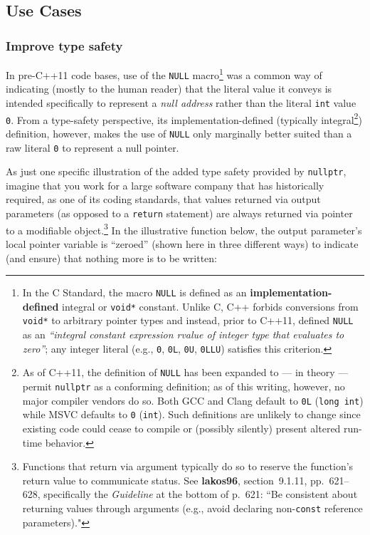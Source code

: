 \subsection[Use Cases]{Use Cases}\label{use-cases}

\subsubsection[Improve type safety]{Improve type safety}\label{improve-type-safety}

In pre-C++11 code bases, use of the \texttt{NULL}
macro{\cprotect\footnote{In the C Standard, the macro \texttt{NULL} is
defined as an \textbf{implementation-defined} integral or \texttt{void*}
constant. Unlike C, C++ forbids conversions from \texttt{void*} to
arbitrary pointer types and instead, prior to C++11, defined
\texttt{NULL} as an \emph{``integral constant expression rvalue of
integer type that evaluates to zero''}; any integer literal (e.g.,
\texttt{0}, \texttt{0L}, \texttt{0U}, \texttt{0LLU}) satisfies this
criterion.}} was a common way of indicating (mostly to the human
reader) that the literal value it conveys is intended specifically to
represent a \emph{null address} rather than the literal \texttt{int}
value \texttt{0}. From a type-safety perspective, its
implementation-defined (typically integral{\cprotect\footnote{As of
C++11, the definition of \texttt{NULL} has been expanded to --- in
theory --- permit \texttt{nullptr} as a conforming definition; as of
this writing, however, no major compiler vendors do so. Both GCC and
Clang default to \texttt{0L} (\texttt{long}~\texttt{int}) while MSVC
defaults to \texttt{0} (\texttt{int}). Such definitions are unlikely
to change since existing code could cease to compile or (possibly
silently) present altered run-time behavior.}}) definition, however,
makes the use of \texttt{NULL} only marginally better suited than a raw
literal \texttt{0} to represent a null pointer.

As just one specific illustration of the added type safety provided by
\texttt{nullptr}, imagine that you work for a large software company
that has historically required, as one of its coding standards, that
values returned via output parameters (as opposed to a \texttt{return}
statement) are always returned via pointer to a modifiable
object.{\cprotect\footnote{Functions that return via argument typically
do so to reserve the function's return value to communicate status.
See \textbf{{lakos96}}, section~9.1.11, pp.~621--628, specifically the
\emph{Guideline} at the bottom of p.~621: ``Be consistent about
returning values through arguments (e.g., avoid declaring
non-\texttt{const} reference parameters)."}} In the illustrative function below, the output parameter's local pointer
variable is ``zeroed'' (shown here in three different ways) to indicate
(and ensure) that nothing more is to be written:

